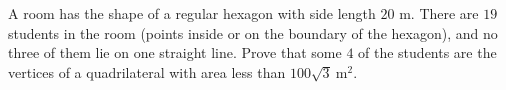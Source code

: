 A room has the shape of a regular hexagon with side length $20$ m. There are $19$ students in the room (points inside or on the boundary of the hexagon), and no three of them lie on one straight line. Prove that some $4$ of the students are the vertices of a quadrilateral with area less than $100\sqrt3\ \text{m}^2$.
